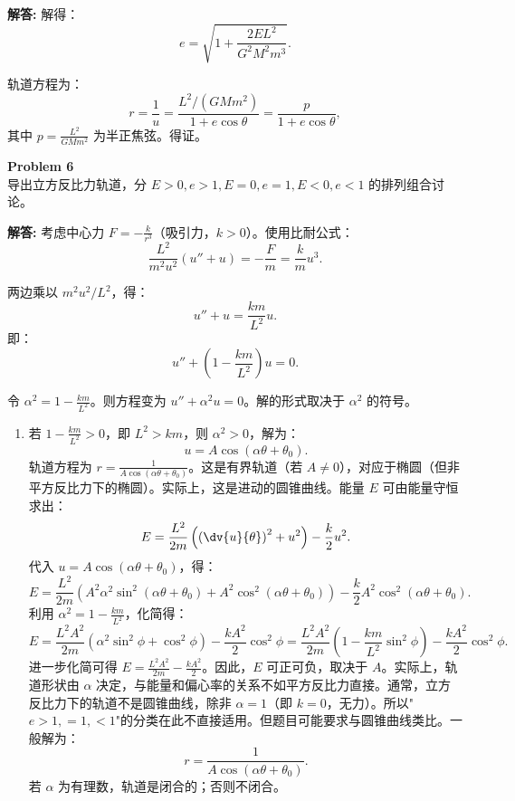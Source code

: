 \documentclass[12pt, a4paper, oneside]{ctexart}
\newenvironment{solution}{\par\noindent\textbf{解答:}\quad}{\par}
\begin{document}
\begin{solution}
    解得：
    \[
    e = \sqrt{1 + \frac{2 E L^2}{G^2 M^2 m^3}}.
    \]
    
    轨道方程为：
    \[
    r = \frac{1}{u} = \frac{L^2/(GM m^2)}{1 + e \cos\theta} = \frac{p}{1 + e \cos\theta},
    \]
    其中 \(p = \frac{L^2}{GM m^2}\) 为半正焦弦。得证。
\end{solution}

\begin{mdframed}[backgroundcolor=gray!10, linewidth=0pt]
    \textbf{Problem 6} \\
    导出立方反比力轨道，分 \(E>0, e>1, E=0, e=1, E<0, e<1\) 的排列组合讨论。
\end{mdframed}
\begin{solution}
    考虑中心力 \(F = -\frac{k}{r^3}\)（吸引力，\(k>0\)）。使用比耐公式：
    \[
    \frac{L^2}{m^2 u^2} (u'' + u) = -\frac{F}{m} = \frac{k}{m} u^3.
    \]
    
    两边乘以 \(m^2 u^2 / L^2\)，得：
    \[
    u'' + u = \frac{k m}{L^2} u.
    \]
    即：
    \[
    u'' + \left(1 - \frac{k m}{L^2}\right) u = 0.
    \]
    
    令 \(\alpha^2 = 1 - \frac{k m}{L^2}\)。则方程变为 \(u'' + \alpha^2 u = 0\)。解的形式取决于 \(\alpha^2\) 的符号。
    
    \begin{enumerate}
        \item 若 \(1 - \frac{k m}{L^2} > 0\)，即 \(L^2 > k m\)，则 \(\alpha^2 > 0\)，解为：
        \[
        u = A \cos(\alpha \theta + \theta_0).
        \]
        轨道方程为 \(r = \frac{1}{A \cos(\alpha \theta + \theta_0)}\)。这是有界轨道（若 \(A \neq 0\)），对应于椭圆（但非平方反比力下的椭圆）。实际上，这是进动的圆锥曲线。能量 \(E\) 可由能量守恒求出：
        \[
        E = \frac{L^2}{2m} \left( \left(\dv{u}{\theta}\right)^2 + u^2 \right) - \frac{k}{2} u^2.
        \]
        代入 \(u = A \cos(\alpha \theta + \theta_0)\)，得：
        \[
        E = \frac{L^2}{2m} \left( A^2 \alpha^2 \sin^2(\alpha \theta + \theta_0) + A^2 \cos^2(\alpha \theta + \theta_0) \right) - \frac{k}{2} A^2 \cos^2(\alpha \theta + \theta_0).
        \]
        利用 \(\alpha^2 = 1 - \frac{k m}{L^2}\)，化简得：
        \[
        E = \frac{L^2 A^2}{2m} \left( \alpha^2 \sin^2\phi + \cos^2\phi \right) - \frac{k A^2}{2} \cos^2\phi = \frac{L^2 A^2}{2m} \left(1 - \frac{k m}{L^2} \sin^2\phi \right) - \frac{k A^2}{2} \cos^2\phi.
        \]
        进一步化简可得 \(E = \frac{L^2 A^2}{2m} - \frac{k A^2}{2}\)。因此，\(E\) 可正可负，取决于 \(A\)。实际上，轨道形状由 \(\alpha\) 决定，与能量和偏心率的关系不如平方反比力直接。通常，立方反比力下的轨道不是圆锥曲线，除非 \(\alpha=1\)（即 \(k=0\)，无力）。所以"\(e>1,=1,<1\)"的分类在此不直接适用。但题目可能要求与圆锥曲线类比。一般解为：
        \[
        r = \frac{1}{A \cos(\alpha \theta + \theta_0)}.
        \]
        若 \(\alpha\) 为有理数，轨道是闭合的；否则不闭合。
        

\end{enumerate}
\end{solution}
\end{document}
